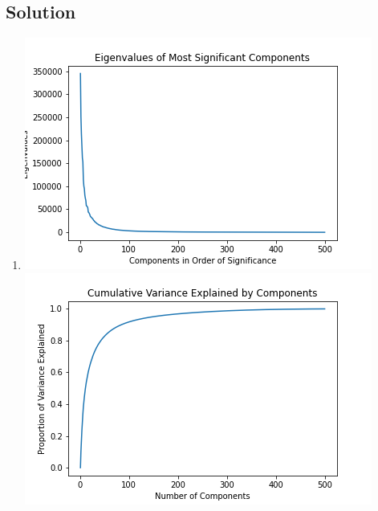 \documentclass[submit]{harvardml}
\begin{document}
\subsection*{Solution}
\begin{enumerate}
    \item \includegraphics[]{EigSig (1).png}\\
    \includegraphics[]{VarExplained (1).png}\\
    \\
    

\end{enumerate}
\end{document}
